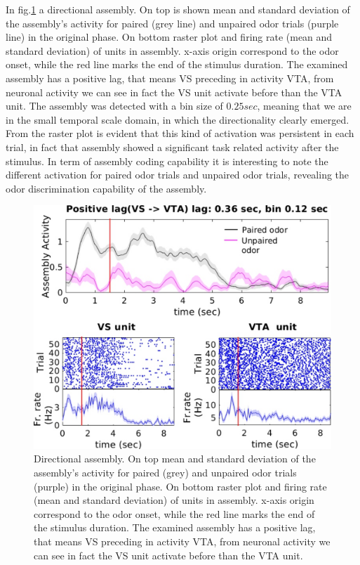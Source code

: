 In fig.\ref{fig:directional_assembly} a directional assembly. On top is shown mean and standard deviation of the assembly's activity for paired (grey line) and unpaired odor trials (purple line) in the original phase. On bottom raster plot and firing rate (mean and standard deviation) of units in assembly. x-axis origin correspond to the odor onset, while the red line marks the end of the stimulus duration. The examined assembly has a positive lag, that means VS preceding in activity VTA, from neuronal activity we can see in fact the VS unit activate before than the VTA unit. The assembly was detected with a bin size of $0.25 sec$, meaning that we are in the small temporal scale domain, in which the directionality clearly emerged. From the raster plot is evident that this kind of activation was persistent in each trial, in fact that assembly showed a significant task related activity after the stimulus. In term of assembly coding capability it is interesting to note the different activation for paired odor trials and unpaired odor trials, revealing the odor discrimination capability of the assembly. 
\begin{figure}
    \centering
    \includegraphics[scale=0.6]{figures/DirectionalAsEx1.pdf}
    \caption{Directional assembly. On top mean and standard deviation of the assembly's activity for paired (grey) and unpaired odor trials (purple) in the original phase. On bottom raster plot and firing rate (mean and standard deviation) of units in assembly. x-axis origin correspond to the odor onset, while the red line marks the end of the stimulus duration. The examined assembly has a positive lag, that means VS preceding in activity VTA, from neuronal activity we can see in fact the VS unit activate before than the VTA unit.}
    \label{fig:directional_assembly}
\end{figure}
